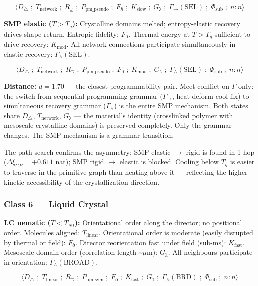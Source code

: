\documentclass[12pt,a4paper]{article}
\begin{document}
\[\langle D_\triangle \;;\; T_\text{network} \;;\; R_{\supseteq} \;;\; P_{\text{pm\_pseudo}} \;;\; F_\hbar \;;\; K_\text{slow} \;;\; G_\gimel \;;\; \Gamma_\to(\text{SEL}) \;;\; \Phi_\text{sub} \;;\; n:n \rangle\]

\textbf{SMP elastic ($T > T_g$):} Crystalline domains melted; entropy-elastic recovery drives shape return. Entropic fidelity: $F_\eth$. Thermal energy at $T > T_g$ sufficient to drive recovery: $K_\text{mod}$. All network connections participate simultaneously in elastic recovery: $\Gamma_\wedge(\text{SEL})$.

\[\langle D_\triangle \;;\; T_\text{network} \;;\; R_{\supseteq} \;;\; P_{\text{pm\_pseudo}} \;;\; F_\eth \;;\; K_\text{mod} \;;\; G_\gimel \;;\; \Gamma_\wedge(\text{SEL}) \;;\; \Phi_\text{sub} \;;\; n:n \rangle\]

\textbf{Distance:} $d = 1.70$ --- the closest programmability pair. Meet conflict on $\Gamma$ only: the switch from sequential programming grammar ($\Gamma_\to$, heat-deform-cool-fix) to simultaneous recovery grammar ($\Gamma_\wedge$) is the entire SMP mechanism. Both states share $D_\triangle$, $T_\text{network}$, $G_\gimel$ --- the material's identity (crosslinked polymer with mesoscale crystalline domains) is preserved completely. Only the grammar changes. The SMP mechanism is a grammar transition.

The path search confirms the asymmetry: SMP elastic $\to$ rigid is found in 1 hop ($\Delta\xi_{CP} = +0.611$ nat); SMP rigid $\to$ elastic is blocked. Cooling below $T_g$ is easier to traverse in the primitive graph than heating above it --- reflecting the higher kinetic accessibility of the crystallization direction.

\subsubsection{Class 6 --- Liquid Crystal}

\textbf{LC nematic ($T < T_{NI}$):} Orientational order along the director; no positional order. Molecules aligned: $T_\text{linear}$. Orientational order is moderate (easily disrupted by thermal or field): $F_\eth$. Director reorientation fast under field (sub-ms): $K_\text{fast}$. Mesoscale domain order (correlation length \textasciitilde{}$\mu$m): $G_\gimel$. All neighbours participate in orientation: $\Gamma_\wedge(\text{BROAD})$.

\[\langle D_\triangle \;;\; T_\text{linear} \;;\; R_{\supseteq} \;;\; P_{\text{pm\_sym}} \;;\; F_\eth \;;\; K_\text{fast} \;;\; G_\gimel \;;\; \Gamma_\wedge(\text{BRD}) \;;\; \Phi_\text{sub} \;;\; n:n \rangle\]
\end{document}
